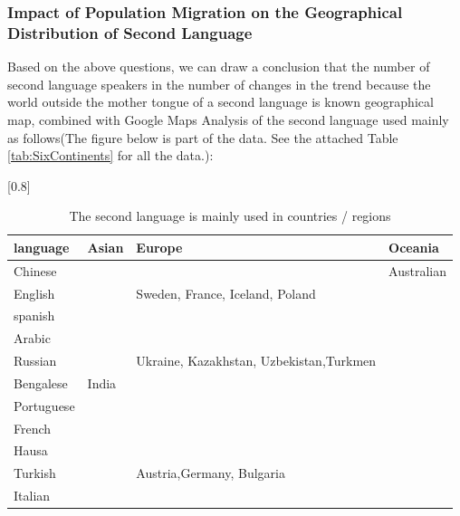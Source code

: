 \subsubsection{Impact of Population Migration on the Geographical Distribution of Second Language}
\noindent Based on the above questions, we can draw a conclusion that the number of second language speakers in the number of changes in the trend because the world outside the mother tongue of a second language is known geographical map, combined with Google Maps Analysis of the second language used mainly as follows(The figure below is part of the data. See the attached Table \ref{tab:SixContinents} for all the data.):

\begin{table}[H]
	\centering
	\caption{ The second language is mainly used in countries / regions}
	 \scalebox{0.8}[0.8]{%
	\begin{tabular}{llp{6cm}p{6cm}}
		\toprule
		language & Asian & Europe & Oceania \\
		\midrule
		Chinese &       &       & Australian \\
		\midrule
		English &       & Sweden, France, Iceland, Poland &  \\	\midrule
		spanish &       &       &  \\	\midrule
		Arabic &       &       &  \\	\midrule
		Russian &       &Ukraine, Kazakhstan, Uzbekistan,Turkmen&  \\	\midrule
		Bengalese & India&       &  \\	\midrule
		Portuguese &       &       &  \\	\midrule
		French &       &       &  \\	\midrule
		Hausa &       &       &  \\	\midrule
		Turkish &       & Austria,Germany, Bulgaria &  \\	\midrule
		Italian &       &       &  \\
		\bottomrule
	\end{tabular}%
}
	\label{tab:addlabel}%
\end{table}%

